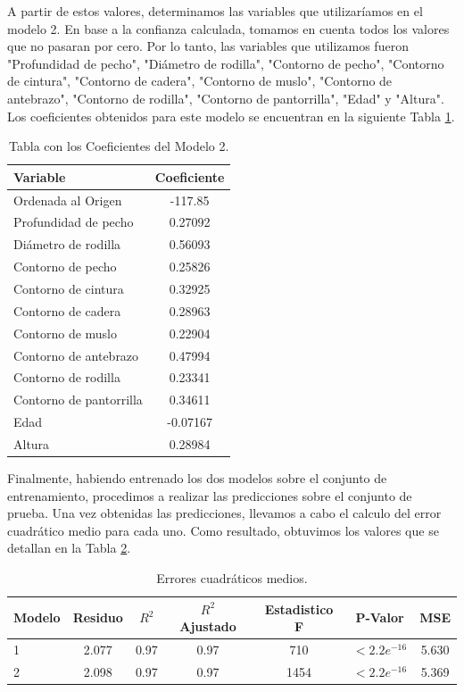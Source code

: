 \documentclass{article} %
\begin{document}
A partir de estos valores, determinamos las variables que utilizaríamos en el modelo 2. En base a la confianza calculada, tomamos en cuenta todos los valores que no pasaran por cero. Por lo tanto, las variables que utilizamos fueron "Profundidad de pecho", "Diámetro de rodilla", "Contorno de pecho", "Contorno de cintura", "Contorno de cadera", "Contorno de muslo", "Contorno de antebrazo", "Contorno de rodilla", "Contorno de pantorrilla", "Edad" y "Altura". Los coeficientes obtenidos para este modelo se encuentran en la siguiente Tabla \ref{tab:table-punto-1-3-c}.

\begin{table}[H]
	\centering
		\begin{tabular}{||l | c ||}
			\hline
			\hline
			Variable & Coeficiente \\
			\hline			
			\hline
			Ordenada al Origen & -117.85  \\
			\hline
			Profundidad de pecho & 0.27092\\
			\hline
			Diámetro de rodilla &  0.56093\\
			\hline
			Contorno de pecho &  0.25826\\
			\hline
			Contorno de cintura & 0.32925\\
			\hline
			Contorno de cadera &  0.28963\\
			\hline
			Contorno de muslo & 0.22904\\
			\hline
			Contorno de antebrazo &  0.47994\\
			\hline
			Contorno de rodilla & 0.23341\\
			\hline
			Contorno de pantorrilla & 0.34611\\
			\hline
			Edad & -0.07167\\
			\hline
			Altura & 0.28984\\
			\hline
			\hline
		\end{tabular}
		\caption{Tabla con los Coeficientes del Modelo 2.}
	\label{tab:table-punto-1-3-c}
\end{table}

Finalmente, habiendo entrenado los dos modelos sobre el conjunto de entrenamiento, procedimos a realizar las predicciones sobre el conjunto de prueba. Una vez obtenidas las predicciones, llevamos a cabo el calculo del error cuadrático medio para cada uno. Como resultado, obtuvimos los valores que se detallan en la Tabla \ref{tab:table-punto-1-3-d}.


\begin{table}[H]
	\centering
		\begin{tabular}{||l | c || c || c || c || c || c ||}
			\hline
			\hline
			Modelo & Residuo & $R^2$ & $R^2$ Ajustado & Estadistico F & P-Valor & MSE\\
			\hline			
			\hline
			1 & 2.077 & 0.97 & 0.97 & 710 & $<2.2e^{-16}$ & 5.630\\
			\hline
			2 & 2.098 & 0.97 & 0.97 & 1454 & $<2.2e^{-16}$ & 5.369\\
			\hline
			\hline
		\end{tabular}
		\caption{Errores cuadráticos medios.}
	\label{tab:table-punto-1-3-d}
\end{table}
\end{document}
